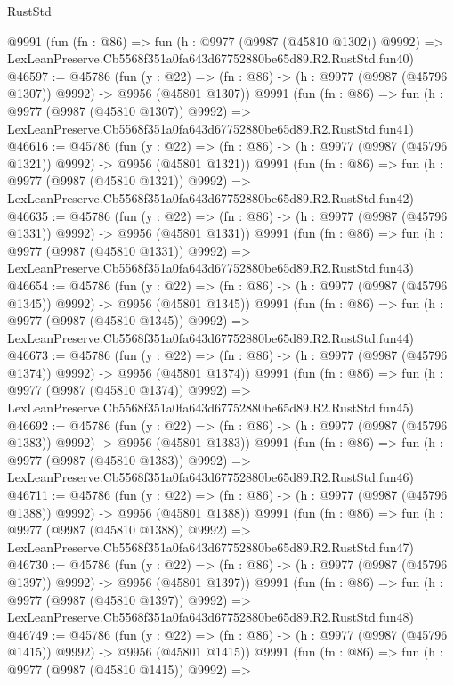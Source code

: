 \begin{lexlean}{RustStd}
\begin{coremodule}
    @9991
    (fun (fn : @86) =>
    fun (h : @9977 (@9987 (@45810 @1302)) @9992) =>
    LexLeanPreserve.Cb5568f351a0fa643d67752880be65d89.R2.RustStd.fun40)
@46597 := @45786
    (fun (y : @22) =>
    (fn : @86) -> (h : @9977 (@9987 (@45796 @1307)) @9992) -> @9956 (@45801 @1307))
    @9991
    (fun (fn : @86) =>
    fun (h : @9977 (@9987 (@45810 @1307)) @9992) =>
    LexLeanPreserve.Cb5568f351a0fa643d67752880be65d89.R2.RustStd.fun41)
@46616 := @45786
    (fun (y : @22) =>
    (fn : @86) -> (h : @9977 (@9987 (@45796 @1321)) @9992) -> @9956 (@45801 @1321))
    @9991
    (fun (fn : @86) =>
    fun (h : @9977 (@9987 (@45810 @1321)) @9992) =>
    LexLeanPreserve.Cb5568f351a0fa643d67752880be65d89.R2.RustStd.fun42)
@46635 := @45786
    (fun (y : @22) =>
    (fn : @86) -> (h : @9977 (@9987 (@45796 @1331)) @9992) -> @9956 (@45801 @1331))
    @9991
    (fun (fn : @86) =>
    fun (h : @9977 (@9987 (@45810 @1331)) @9992) =>
    LexLeanPreserve.Cb5568f351a0fa643d67752880be65d89.R2.RustStd.fun43)
@46654 := @45786
    (fun (y : @22) =>
    (fn : @86) -> (h : @9977 (@9987 (@45796 @1345)) @9992) -> @9956 (@45801 @1345))
    @9991
    (fun (fn : @86) =>
    fun (h : @9977 (@9987 (@45810 @1345)) @9992) =>
    LexLeanPreserve.Cb5568f351a0fa643d67752880be65d89.R2.RustStd.fun44)
@46673 := @45786
    (fun (y : @22) =>
    (fn : @86) -> (h : @9977 (@9987 (@45796 @1374)) @9992) -> @9956 (@45801 @1374))
    @9991
    (fun (fn : @86) =>
    fun (h : @9977 (@9987 (@45810 @1374)) @9992) =>
    LexLeanPreserve.Cb5568f351a0fa643d67752880be65d89.R2.RustStd.fun45)
@46692 := @45786
    (fun (y : @22) =>
    (fn : @86) -> (h : @9977 (@9987 (@45796 @1383)) @9992) -> @9956 (@45801 @1383))
    @9991
    (fun (fn : @86) =>
    fun (h : @9977 (@9987 (@45810 @1383)) @9992) =>
    LexLeanPreserve.Cb5568f351a0fa643d67752880be65d89.R2.RustStd.fun46)
@46711 := @45786
    (fun (y : @22) =>
    (fn : @86) -> (h : @9977 (@9987 (@45796 @1388)) @9992) -> @9956 (@45801 @1388))
    @9991
    (fun (fn : @86) =>
    fun (h : @9977 (@9987 (@45810 @1388)) @9992) =>
    LexLeanPreserve.Cb5568f351a0fa643d67752880be65d89.R2.RustStd.fun47)
@46730 := @45786
    (fun (y : @22) =>
    (fn : @86) -> (h : @9977 (@9987 (@45796 @1397)) @9992) -> @9956 (@45801 @1397))
    @9991
    (fun (fn : @86) =>
    fun (h : @9977 (@9987 (@45810 @1397)) @9992) =>
    LexLeanPreserve.Cb5568f351a0fa643d67752880be65d89.R2.RustStd.fun48)
@46749 := @45786
    (fun (y : @22) =>
    (fn : @86) -> (h : @9977 (@9987 (@45796 @1415)) @9992) -> @9956 (@45801 @1415))
    @9991
    (fun (fn : @86) =>
    fun (h : @9977 (@9987 (@45810 @1415)) @9992) =>

\end{coremodule}
\end{lexlean}
